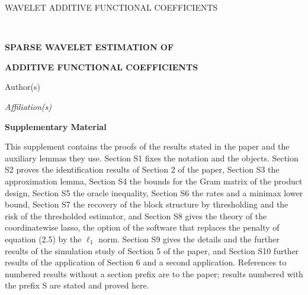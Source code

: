 
\renewcommand{\baselinestretch}{2}


{\hfill {\footnotesize\rm WAVELET ADDITIVE FUNCTIONAL COEFFICIENTS} \hfill}

\renewcommand{\thefootnote}{}
$\ $\par \fontsize{12}{14pt plus.8pt minus .6pt}\selectfont


\centerline{\large\bf SPARSE WAVELET ESTIMATION OF}
\vspace{2pt}
\centerline{\large\bf ADDITIVE FUNCTIONAL COEFFICIENTS}
\vspace{.25cm}
\centerline{Author(s)}
\vspace{.4cm}
\centerline{\it Affiliation(s)}
\vspace{.55cm}
\centerline{\bf Supplementary Material}
\vspace{.55cm}
\fontsize{9}{11.5pt plus.8pt minus .6pt}\selectfont
\noindent
This supplement contains the proofs of the results stated in the paper and
the auxiliary lemmas they use. Section S1 fixes the notation and the objects.
Section S2 proves the identification results of Section 2 of the paper,
Section S3 the approximation lemma, Section S4 the bounds for the Gram matrix
of the product design, Section S5 the oracle inequality,  Section S6 the
rates and a minimax lower bound,  Section S7 the recovery of the block structure by
thresholding and the risk of the thresholded estimator, and
Section S8 gives the theory of the coordinatewise lasso, the option of the
software that replaces the penalty of equation (2.5) by the $\ell_1$ norm.
Section S9 gives the details and the further results of the simulation study
of Section 5 of the paper, and Section S10 further results of the application
of Section 6 and a second application. References to numbered results without a section prefix are to the
paper; results numbered with the prefix S are stated and proved here.
\par

\setcounter{section}{0}
\setcounter{equation}{0}
\def\theequation{S\arabic{section}.\arabic{equation}}
\def\thesection{S\arabic{section}}

\fontsize{12}{14pt plus.8pt minus .6pt}\selectfont

